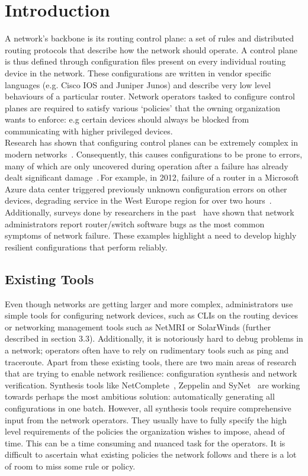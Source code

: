 \section{Introduction}

A network's backbone is its routing control plane: a set of rules and distributed routing protocols that describe how the network should operate. A control plane is thus defined through configuration files present on every individual routing device in the network. These configurations are written in vendor specific languages (e.g. Cisco IOS and Juniper Junos) and describe very low level behaviours of a particular router. Network operators tasked to configure control planes are required to satisfy various `policies' that the owning organization wants to enforce: e.g certain devices should always be blocked from communicating with higher privileged devices.\\

Research has shown that configuring control planes can be extremely complex in modern networks~\cite{complexity}. Consequently, this causes configurations to be prone to errors, many of which are only uncovered during operation after a failure has already dealt significant damage~\cite{errors}. For example, in 2012, failure of a router in a Microsoft Azure data center triggered previously unknown configuration errors on other devices, degrading service in the West Europe region for over two hours~\cite{azure}. Additionally, surveys done by researchers in the past~\cite{Zeng} have shown that network administrators report router/switch software bugs as the most common symptoms of network failure. These examples highlight a need to develop highly resilient configurations that perform reliably.\\  


\subsection{Existing Tools}

Even though networks are getting larger and more complex, administrators use simple tools for configuring network devices, such as CLIs on the routing devices or networking management tools such as NetMRI or SolarWinds (further described in section 3.3). Additionally, it is notoriously hard to debug problems in a network; operators often have to rely on rudimentary tools such as ping and traceroute. Apart from these existing tools, there are two main areas of research that are trying to enable network resilience: configuration synthesis and network verification. Synthesis tools like NetComplete~\cite{NetComplete}, Zeppelin and SyNet~\cite{synet} are working towards perhaps the most ambitious solution: automatically generating all configurations in one batch. However, all synthesis tools require comprehensive input from the network operators. They usually have to fully specify the high level requirements of the policies the organization wishes to impose, ahead of time. This can be a time consuming and nuanced task for the operators. It is difficult to ascertain what existing policies the network follows and there is a lot of room to miss some rule or policy.\\


